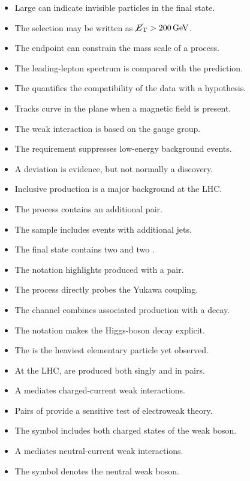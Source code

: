 \begin{itemize}
\item Large \MET can indicate invisible particles in the final state.
\item The selection may be written as ${\MET > \qty{200}{\GeV}}$.
\item The \MTtwo endpoint can constrain the mass scale of a process.
\item The leading-lepton \pT spectrum is compared with the prediction.
\item The \pvalue quantifies the compatibility of the data with a hypothesis.
\item Tracks curve in the \rphi plane when a magnetic field is present.
\item The weak interaction is based on the \SUtwoL gauge group.
\item The \ST requirement suppresses low-energy background events.
\item A \threesigma deviation is evidence, but not normally a discovery.
\item Inclusive \ttbar production is a major background at the LHC.
\item The \ttbarplusbbbar process contains an additional \bquark pair.
\item The \ttbarplusjets sample includes events with additional jets.
\item The \ttbb final state contains two \tquarks and two \bquarks.
\item The \ttplusbb notation highlights \bjets produced with a \tquark pair.
\item The \ttH process directly probes the \tquark Yukawa coupling.
\item The \ttHbb channel combines associated production with a \bquark decay.
\item The \ttHtobb notation makes the Higgs-boson decay explicit.
\item The \tquark is the heaviest elementary particle yet observed.
\item At the LHC, \tquarks are produced both singly and in pairs.
\item A \Wboson mediates charged-current weak interactions.
\item Pairs of \Wbosons provide a sensitive test of electroweak theory.
\item The symbol \Wpm includes both charged states of the weak boson.
\item A \Zboson mediates neutral-current weak interactions.
\item The symbol \Zzero denotes the neutral weak boson.
\end{itemize}
